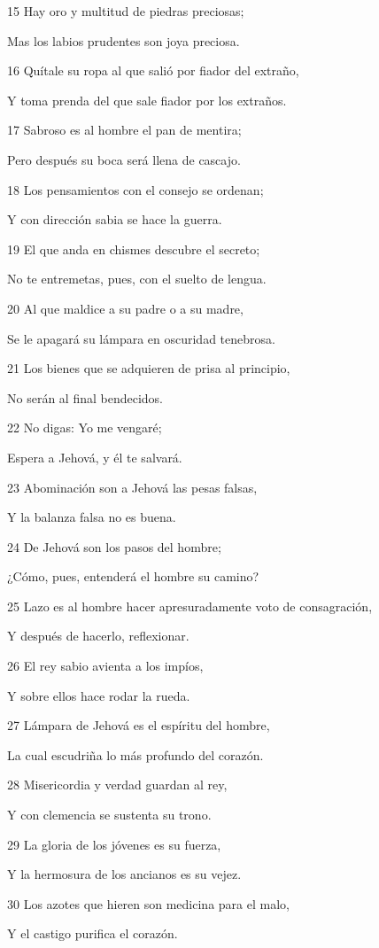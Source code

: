 \par 15 Hay oro y multitud de piedras preciosas;
\par Mas los labios prudentes son joya preciosa.
\par 16 Quítale su ropa al que salió por fiador del extraño,
\par Y toma prenda del que sale fiador por los extraños.
\par 17 Sabroso es al hombre el pan de mentira;
\par Pero después su boca será llena de cascajo.
\par 18 Los pensamientos con el consejo se ordenan;
\par Y con dirección sabia se hace la guerra.
\par 19 El que anda en chismes descubre el secreto;
\par No te entremetas, pues, con el suelto de lengua.
\par 20 Al que maldice a su padre o a su madre,
\par Se le apagará su lámpara en oscuridad tenebrosa.
\par 21 Los bienes que se adquieren de prisa al principio, 
\par No serán al final bendecidos.
\par 22 No digas: Yo me vengaré;
\par Espera a Jehová, y él te salvará.
\par 23 Abominación son a Jehová las pesas falsas,
\par Y la balanza falsa no es buena.
\par 24 De Jehová son los pasos del hombre;
\par ¿Cómo, pues, entenderá el hombre su camino?
\par 25 Lazo es al hombre hacer apresuradamente voto de consagración,
\par Y después de hacerlo, reflexionar.
\par 26 El rey sabio avienta a los impíos,
\par Y sobre ellos hace rodar la rueda.
\par 27 Lámpara de Jehová es el espíritu del hombre,
\par La cual escudriña lo más profundo del corazón.
\par 28 Misericordia y verdad guardan al rey,
\par Y con clemencia se sustenta su trono.
\par 29 La gloria de los jóvenes es su fuerza,
\par Y la hermosura de los ancianos es su vejez.
\par 30 Los azotes que hieren son medicina para el malo,
\par Y el castigo purifica el corazón.

